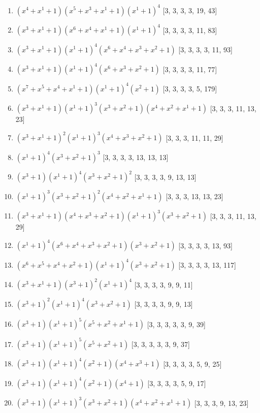 \documentclass[10pt,twocolumn]{article}
\begin{document}
\begin{enumerate}
\item $(x^{4} + x^{1} + 1)(x^{5} + x^{3} + x^{1} + 1)(x^{1} + 1)^{4}$  [3, 3, 3, 3, 19, 43]
\item $(x^{3} + x^{1} + 1)(x^{6} + x^{4} + x^{1} + 1)(x^{1} + 1)^{4}$  [3, 3, 3, 3, 11, 83]
\item $(x^{3} + x^{1} + 1)(x^{1} + 1)^{4}(x^{6} + x^{4} + x^{3} + x^{2} + 1)$  [3, 3, 3, 3, 11, 93]
\item $(x^{3} + x^{1} + 1)(x^{1} + 1)^{4}(x^{6} + x^{3} + x^{2} + 1)$  [3, 3, 3, 3, 11, 77]
\item $(x^{7} + x^{5} + x^{4} + x^{1} + 1)(x^{1} + 1)^{4}(x^{2} + 1)$  [3, 3, 3, 3, 5, 179]
\item $(x^{3} + x^{1} + 1)(x^{1} + 1)^{3}(x^{3} + x^{2} + 1)(x^{4} + x^{2} + x^{1} + 1)$  [3, 3, 3, 11, 13, 23]
\item $(x^{3} + x^{1} + 1)^{2}(x^{1} + 1)^{3}(x^{4} + x^{3} + x^{2} + 1)$  [3, 3, 3, 11, 11, 29]
\item $(x^{1} + 1)^{4}(x^{3} + x^{2} + 1)^{3}$  [3, 3, 3, 3, 13, 13, 13]
\item $(x^{3} + 1)(x^{1} + 1)^{4}(x^{3} + x^{2} + 1)^{2}$  [3, 3, 3, 3, 9, 13, 13]
\item $(x^{1} + 1)^{3}(x^{3} + x^{2} + 1)^{2}(x^{4} + x^{2} + x^{1} + 1)$  [3, 3, 3, 13, 13, 23]
\item $(x^{3} + x^{1} + 1)(x^{4} + x^{3} + x^{2} + 1)(x^{1} + 1)^{3}(x^{3} + x^{2} + 1)$  [3, 3, 3, 11, 13, 29]
\item $(x^{1} + 1)^{4}(x^{6} + x^{4} + x^{3} + x^{2} + 1)(x^{3} + x^{2} + 1)$  [3, 3, 3, 3, 13, 93]
\item $(x^{6} + x^{5} + x^{4} + x^{2} + 1)(x^{1} + 1)^{4}(x^{3} + x^{2} + 1)$  [3, 3, 3, 3, 13, 117]
\item $(x^{3} + x^{1} + 1)(x^{3} + 1)^{2}(x^{1} + 1)^{4}$  [3, 3, 3, 3, 9, 9, 11]
\item $(x^{3} + 1)^{2}(x^{1} + 1)^{4}(x^{3} + x^{2} + 1)$  [3, 3, 3, 3, 9, 9, 13]
\item $(x^{3} + 1)(x^{1} + 1)^{5}(x^{5} + x^{2} + x^{1} + 1)$  [3, 3, 3, 3, 3, 9, 39]
\item $(x^{3} + 1)(x^{1} + 1)^{5}(x^{5} + x^{2} + 1)$  [3, 3, 3, 3, 3, 9, 37]
\item $(x^{3} + 1)(x^{1} + 1)^{4}(x^{2} + 1)(x^{4} + x^{3} + 1)$  [3, 3, 3, 3, 5, 9, 25]
\item $(x^{3} + 1)(x^{1} + 1)^{4}(x^{2} + 1)(x^{4} + 1)$  [3, 3, 3, 3, 5, 9, 17]
\item $(x^{3} + 1)(x^{1} + 1)^{3}(x^{3} + x^{2} + 1)(x^{4} + x^{2} + x^{1} + 1)$  [3, 3, 3, 9, 13, 23]

\end{enumerate}
\end{document}
